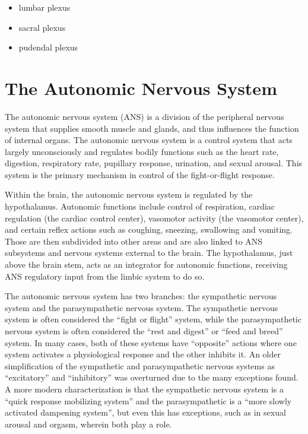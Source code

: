 \begin{itemize}
\tightlist
\item
  lumbar plexus
\item
  sacral plexus
\item
  pudendal plexus
\end{itemize}

\hypertarget{the-autonomic-nervous-system}{%
\section{The Autonomic Nervous System}\label{the-autonomic-nervous-system}}

The autonomic nervous system (ANS) is a division of the peripheral nervous system that supplies smooth muscle and glands, and thus influences the function of internal organs. The autonomic nervous system is a control system that acts largely unconsciously and regulates bodily functions such as the heart rate, digestion, respiratory rate, pupillary response, urination, and sexual arousal. This system is the primary mechanism in control of the fight-or-flight response.

Within the brain, the autonomic nervous system is regulated by the hypothalamus. Autonomic functions include control of respiration, cardiac regulation (the cardiac control center), vasomotor activity (the vasomotor center), and certain reflex actions such as coughing, sneezing, swallowing and vomiting. Those are then subdivided into other areas and are also linked to ANS subsystems and nervous systems external to the brain. The hypothalamus, just above the brain stem, acts as an integrator for autonomic functions, receiving ANS regulatory input from the limbic system to do so.

The autonomic nervous system has two branches: the sympathetic nervous system and the parasympathetic nervous system. The sympathetic nervous system is often considered the ``fight or flight'' system, while the parasympathetic nervous system is often considered the ``rest and digest'' or ``feed and breed'' system. In many cases, both of these systems have ``opposite'' actions where one system activates a physiological response and the other inhibits it. An older simplification of the sympathetic and parasympathetic nervous systems as ``excitatory'' and ``inhibitory'' was overturned due to the many exceptions found. A more modern characterization is that the sympathetic nervous system is a ``quick response mobilizing system'' and the parasympathetic is a ``more slowly activated dampening system'', but even this has exceptions, such as in sexual arousal and orgasm, wherein both play a role.

